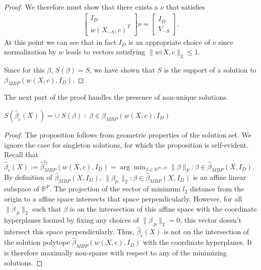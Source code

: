 \begin{proof}
We therefore must show that there exists a $\nu$ that satisfies
\begin{align}
\begin{bmatrix}
I_D \\
w(X_{-S},c)^T
\end{bmatrix}\nu  = \begin{bmatrix}
I_D \\
V_{-S}
\end{bmatrix}.
\end{align}
At this point we can see that in fact $I_D$ is an appropriate choice of $\nu$ since normalization by $w$ leads to vectors satisfying $\|w(X,c\|_2 \leq 1$.

Since for this $\beta$, $S(\beta) = S$, we have shown that $S$ is the support of a solution to $\beta_{MBP} (w(X,c), I_D)$.
\end{proof}

The next part of the proof handles the presence of non-unique solutions.

\begin{proposition}
\label{prop:support_containment}
$S(\widehat \beta_c ( X)) = \cup \; S(\beta) \; : \;  \beta \in  \mathcal \beta_{MBP} (w(X,c), I_D)$
 \end{proposition}

\begin{proof}
The proposition follows from geometric properties of the solution set.
We ignore the case for singleton solutions, for which the proposition is self-evident.
Recall that $\widehat \beta_c ( X) := \widehat \beta_{MBP}^{l_2} ( w(X,c), I_D ) =  \arg \min_{\beta \in \mathbb R^{P \times D} } \|\beta\|_F : \beta \in \widehat {\mathcal \beta}_{MBP}(X, I_D)  $.
By definition of $\widehat {\mathcal \beta}_{MBP} (X, I_D) $, $\|\beta_{p.} \|_2 : \beta \in  \widehat { \mathcal \beta}_{MBP} (X, I_D) $ is an affine linear subspace of $\mathbb R^{P}.$
The projection of the vector of minimum $l_2$ distance from the origin to a affine space intersects that space perpendicularly.
However, for all $\|\beta_{.p}\|_2$ such that $\beta$ is on the intersection of this affine space with the coordinate hyperplanes formed by fixing any choices of $\|\beta_{.p}\|_2 = 0$, this vector doesn't intersect this space perpendicularly.
Thus, $\widehat \beta_c ( X)$ is not on the intersection of the solution polytope $ \widehat {\mathcal \beta}_{MBP} (w(X,c), I_D)$ with the coordinate hyperplanes.
It is therefore maximally non-sparse with respect to any of the minimizing solutions.
\end{proof}

